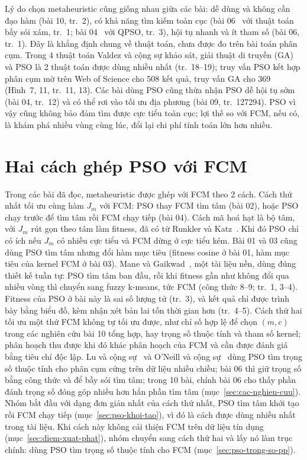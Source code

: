 Lý do chọn metaheuristic cũng giống nhau giữa các bài: dễ dùng và không cần đạo hàm (bài 10, tr.~2), có khả năng tìm
kiếm toàn cục (bài 06~\cite{liu2021msgwo} với thuật toán bầy sói xám, tr.~1; bài 04~\cite{zhang2025qpsofcm}
với QPSO, tr.~3), hội tụ nhanh và ít tham số (bài 06, tr.~1). Đây là khẳng định chung về thuật toán, chưa được đo trên bài toán phân cụm. Trong 4 thuật toán Valdez và cộng sự khảo
sát, giải thuật di truyền (GA) và PSO là 2 thuật toán được dùng nhiều nhất (tr.~18--19); truy vấn PSO kết hợp phân cụm mờ
trên Web of Science cho 508 kết quả, truy vấn GA cho 369 (Hình~7, 11, tr.~11, 13). Các bài dùng PSO cũng thừa nhận PSO dễ hội tụ sớm (bài 04, tr.~12) và có thể rơi
vào tối ưu địa phương (bài 09, tr.~127294). PSO vì vậy cũng không bảo đảm tìm được cực tiểu toàn cục; lợi thế so với
FCM, nếu có, là khám phá nhiều vùng cùng lúc, đổi lại chi phí tính toán lớn hơn nhiều.

\section{Hai cách ghép PSO với FCM}
\label{sec:metaheuristic}

Trong các bài đã đọc, metaheuristic được ghép với FCM theo 2 cách. Cách thứ nhất tối ưu cùng hàm $J_m$ với FCM: PSO thay
FCM tìm tâm (bài 02), hoặc PSO chạy trước để tìm tâm rồi FCM chạy tiếp (bài 04). Cách mã hoá hạt là bộ tâm, với $J_m$ rút
gọn theo tâm làm fitness, đã có từ Runkler và Katz~\cite{runkler2006psofcm}. Khi đó PSO chỉ có ích nếu $J_m$ có nhiều cực
tiểu và FCM dừng ở cực tiểu kém. Bài 01 và 03 cũng dùng PSO tìm tâm nhưng đổi hàm mục tiêu (fitness cosine ở bài 01, hàm
mục tiêu của kernel FCM ở bài 03). Mane và Gaikwad~\cite{mane2014hpso}, một tài liệu nền, dùng đúng thiết kế tuần tự:
PSO tìm tâm ban đầu, rồi khi fitness gần như không đổi qua nhiều vòng thì chuyển sang fuzzy k-means, tức FCM (công thức 8--9; tr.~1, 3--4). Fitness
của PSO ở bài này là sai số lượng tử (tr.~3), và kết quả chỉ được trình bày bằng biểu đồ, kèm nhận xét bản lai tốn thời
gian hơn (tr.~4--5). Cách thứ hai tối ưu một thứ FCM không tự tối ưu được, như chỉ số
hợp lệ để chọn $(m, c)$ trong các nghiên cứu bài 10 tổng hợp, hay trọng số thuộc tính và tham số kernel; phân hoạch thu được
khi đó khác phân hoạch của FCM và cần được đánh giá bằng tiêu chí độc lập. Lu và cộng sự~\cite{lu2011psovw} và O'Neill và
cộng sự~\cite{oneill2018psofw} dùng PSO tìm trọng số thuộc tính cho phân cụm cứng trên dữ liệu nhiều chiều; bài 06 thì giữ
trọng số bằng công thức và để bầy sói tìm tâm; trong 10 bài, chính bài 06 cho thấy phần đánh trọng số đóng góp nhiều hơn
hẳn phần tìm tâm (mục~\ref{sec:cac-nghien-cuu}). Nhóm bắt đầu với dạng đơn giản nhất của cách thứ nhất, PSO tìm tâm khởi tạo rồi FCM chạy tiếp
(mục~\ref{sec:pso-khoi-tao}), vì đó là cách được dùng nhiều nhất trong tài liệu. Khi cách này không cải thiện FCM trên dữ
liệu tín dụng (mục~\ref{sec:diem-xuat-phat}), nhóm chuyển sang cách thứ hai và lấy nó làm trục chính: dùng PSO tìm trọng số
thuộc tính cho FCM (mục~\ref{sec:pso-trong-so-pp}).

